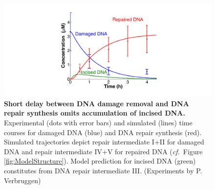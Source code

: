 \begin{figure}[htbp]
	\begin{center}
		\includegraphics[width=1\textwidth]{Abbildungen/figure2_7.pdf}
		\caption{\textbf{Short delay between DNA damage removal and DNA repair synthesis omits accumulation of incised DNA.} Experimental (dots with error bars) and simulated (lines) time courses for damaged DNA (blue) and DNA repair synthesis (red). Simulated trajectories depict repair intermediate I+II for damaged DNA and repair intermediate IV+V for repaired DNA (\textit{cf.}\ Figure \ref{fig:ModelStructure}). Model prediction for incised DNA (green) constitutes from DNA repair intermediate III. (Experiments by P. Verbruggen)}
		\label{fig:ModelFit_intermed}
	\end{center}
\end{figure}

